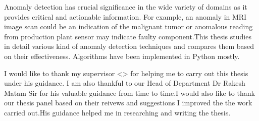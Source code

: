 \noindent



\vspace{0.5in}

\noindent
 Anomaly detection has crucial significance in the wide variety of domains as it provides critical and actionable information. For example, an anomaly in MRI image scan could be an indication of the malignant tumor or anomalous reading from production plant sensor may indicate faulty component.This thesis studies in detail various kind of anomaly detection techniques and compares them based on their effectiveness. Algorithms have been implemented in Python mostly.

I would like to thank my supervisor <> for helping me to carry out this thesis under his guidance. I am also thankful to our Head of Department Dr Rakesh Matam Sir for his valuable guidance from time to time.I would also like to thank our thesis panel based on their reivews and suggestions I improved the the work carried out.His guidance helped me in researching and writing the thesis.

